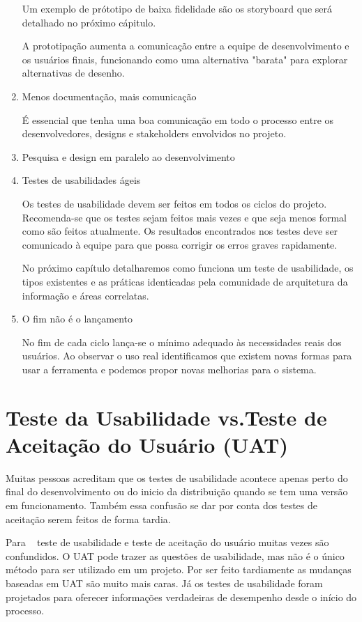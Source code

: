 \begin{enumerate}
	Um exemplo de prótotipo de baixa fidelidade são os storyboard que será detalhado no próximo cápitulo. 

	A prototipação aumenta a comunicação entre a equipe de desenvolvimento e os usuários finais, funcionando como uma alternativa "barata" para explorar alternativas de desenho.
	
\item Menos documentação, mais comunicação

	É essencial que tenha uma boa comunicação em todo o processo entre os desenvolvedores, designs e stakeholders envolvidos no projeto.

\item Pesquisa e design em paralelo ao desenvolvimento


\item Testes de usabilidades ágeis

	Os testes de usabilidade devem ser feitos em todos os ciclos do projeto. Recomenda-se que os testes sejam feitos mais vezes e que seja menos formal como são feitos atualmente. Os resultados encontrados nos testes deve ser comunicado à equipe para que possa corrigir os erros  graves rapidamente.

	No próximo capítulo detalharemos como funciona um teste de usabilidade, os tipos existentes e as práticas identicadas pela comunidade de arquitetura da informação e áreas correlatas.

\item O fim não é o lançamento

	No fim de cada ciclo lança-se o mínimo adequado às necessidades reais dos usuários. Ao observar o uso real identificamos que existem novas formas para usar a ferramenta e podemos propor novas melhorias para o sistema. 
	
\end{enumerate}



\section{Teste da Usabilidade vs.Teste de Aceitação do Usuário (UAT)}

	Muitas pessoas acreditam que os testes de usabilidade acontece apenas perto do final do desenvolvimento ou do inicio da distribuição quando se tem uma versão em funcionamento. Também essa confusão se dar por conta dos testes de aceitação serem feitos de forma tardia. 

	Para ~ teste de usabilidade e teste de aceitação do usuário muitas vezes são confundidos. O UAT pode trazer as questões de usabilidade, mas não é o único método para ser utilizado em um projeto. Por ser feito tardiamente as mudanças baseadas em UAT são muito mais caras. Já os testes de usabilidade foram projetados para oferecer informações verdadeiras de desempenho desde o início do processo.  
	
